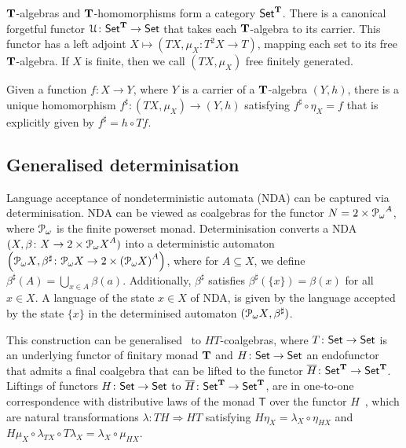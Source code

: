 $\mathbf{T}$-algebras and $\mathbf{T}$-homomorphisms form a category ${\mathsf{Set}}^{\mathbf{T}}$. There is a canonical forgetful functor $\mathcal{U} \colon {\mathsf{Set}}^{\mathbf{T}} \to {\mathsf{Set}}$ that takes each $\mathbf{T}$-algebra to its carrier. This functor has a left adjoint $X \mapsto (TX, \mu_X \colon T^2 X \to T)$, mapping each set to its free $\mathbf{T}$-algebra. If $X$ is finite, then we call $(TX, \mu_X)$ free finitely generated.

Given a function $f \colon X \to Y$, where $Y$ is a carrier of a $\mathbf{T}$-algebra $(Y, h)$, there is a unique homomorphism $f^\sharp \colon (TX, \mu_X) \to (Y,h)$ satisfying $f^\sharp \circ \eta_X = f$ that is explicitly given by $f^\sharp = h \circ Tf$.

\subsection{Generalised determinisation}\label{sec:c4:generalised_determinisation}
Language acceptance of nondeterministic automata (NDA) can be captured via determinisation. {NDA} can be viewed as coalgebras for the functor $N = 2 \times {\mathcal{P}_\omega}^{A}$, where $\mathcal{P}_\omega$ is the finite powerset monad. Determinisation converts a {NDA} $(X, \beta \colon X \to 2 \times {\mathcal{P}_\omega X}^{A})$ into a deterministic automaton $\left({\mathcal{P}_\omega X}, \beta^{\sharp} \colon {\mathcal{P}_\omega X} \to 2 \times {(\mathcal{P}_\omega X)}^{A} \right)$, where for $A \subseteq X$, we define $\beta^{\sharp}(A) = \bigcup_{x \in A} \beta(a)$. Additionally, $\beta^\sharp$ satisfies $\beta^\sharp(\{x\}) = \beta(x)$ for all $x \in X$. A language of the state $x \in X$ of {NDA}, is given by the language accepted by the state $\{x\}$ in the determinised automaton $({\mathcal{P}_\omega X}, \beta^\sharp)$. 


This construction can be generalised~\cite{Silva:2010:Generalizing} to $HT$-coalgebras, where $T \colon {\mathsf{Set}} \to {\mathsf{Set}}$ is an underlying functor of finitary monad $\mathbf{T}$ and $H \colon {\mathsf{Set}} \to {\mathsf{Set}}$ an endofunctor that admits a final coalgebra that can be lifted to the functor $\overline{H} \colon {\mathsf{Set}}^{\mathbf{T}} \to {\mathsf{Set}}^{\mathbf{T}}$. Liftings of functors $H \colon {\mathsf{Set}} \to {\mathsf{Set}}$ to $\overline{H} \colon {\mathsf{Set}}^{\mathbf{T}} \to {\mathsf{Set}}^{\mathbf{T}}$, are in one-to-one correspondence with distributive laws of the monad $\mathsf{T}$ over the functor $H$~\cite{Jacobs:2015:Trace}, which are natural transformations $\lambda \colon TH \Rightarrow HT$ satisfying
$H\eta_X = \lambda_X \circ \eta_{HX}$ and $H \mu_X \circ \lambda_{TX} \circ T\lambda_X = \lambda_X \circ \mu_{HX}$. 

